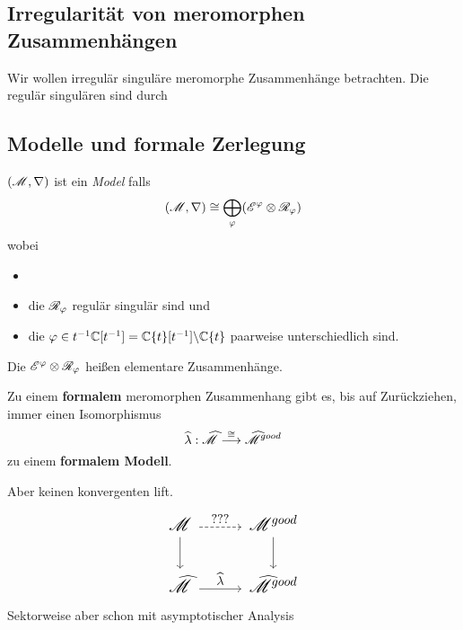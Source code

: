 \subsection{Irregularität von meromorphen Zusammenhängen} %
Wir wollen irregulär singuläre meromorphe Zusammenhänge betrachten. Die regulär
singulären sind durch \TODO

\TODO[\cite{sabbah2007isomonodromic}: Def II.2.24]
\subsection{Modelle und formale Zerlegung}%
\begin{comment}
  Durch das Tensorieren mit formalen Potenzreihen erhält man einen Funktor.
\end{comment}
\begin{defn}
  $(\mathscr{M},\nabla)$ ist ein \emph{Model} falls
  \[
    (\mathscr{M},\nabla)
    \cong
    \bigoplus_\varphi(\mathscr{E}^\varphi\otimes\mathscr{R}_\varphi)
  \]
  wobei
  \begin{itemize}
    \item {}
    \item die $\mathscr{R}_\varphi$ regulär singulär sind und
    \item die $\varphi\in t^{-1}\mathbb{C}[t^{-1}]=\mathbb{C}\{t\}[t^{-1}]\backslash\mathbb{C}\{t\}$
      paarweise unterschiedlich sind.
  \end{itemize}
  Die $\mathscr{E}^\varphi\otimes\mathscr{R}_\varphi$ heißen elementare Zusammenhänge.
\end{defn}
\begin{paracol}{2}
  \begin{thm}
    Zu einem \textbf{formalem} meromorphen Zusammenhang gibt es, bis auf
    Zurückziehen, immer einen Isomorphismus 
    \[
      \widehat\lambda:\widehat{\mathscr{M}}
      \overset{\cong}\longrightarrow
      \widehat{\mathscr{M}}^{good}
    \]
    zu einem \textbf{formalem Modell}.
  \end{thm}
\switchcolumn
  \begin{rem}
    Aber keinen konvergenten lift.
    \[ \Large\begin{tikzcd}
        \sM \dar \rar[dashed]{???} &
        \sM^{good} \dar
        \\\hat\sM \rar{\hat\lambda} &
        \hat\sM^{good}
    \end{tikzcd} \]
    Sektorweise aber schon mit asymptotischer Analysis
  \end{rem}
\end{paracol}
